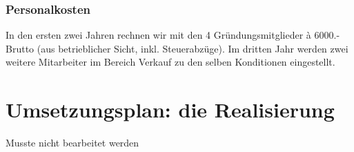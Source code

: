 \subsubsection{Personalkosten}
In den ersten zwei Jahren rechnen wir mit den 4 Gründungsmitglieder à 6000.- Brutto (aus betrieblicher Sicht, inkl. Steuerabzüge). Im dritten Jahr werden zwei weitere Mitarbeiter im Bereich Verkauf zu den selben Konditionen eingestellt.


% 
%
%




\clearpage
\section{Umsetzungsplan: die Realisierung}
Musste nicht bearbeitet werden



